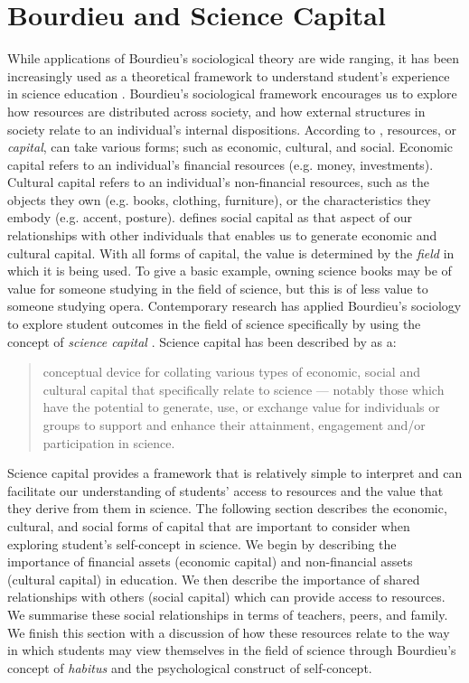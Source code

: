 \section{Bourdieu and Science Capital}
\label{sciencecapital}
While applications of Bourdieu's sociological theory are wide ranging, it has been increasingly used as a theoretical framework to understand student's experience in science education \citep{Archer2015a}. Bourdieu's sociological framework encourages us to explore how resources are distributed across society, and how external structures in society relate to an individual's internal dispositions.  According to \citet{Bourdieu_1986}, resources, or \textit{capital}, can take various forms; such as economic, cultural, and social. Economic capital refers to an individual's financial resources (e.g. money, investments). Cultural capital refers to an individual's non-financial resources, such as the objects they own (e.g. books, clothing, furniture), or the characteristics they embody (e.g. accent, posture). \citet{Bourdieu_1986} defines social capital as that aspect of our relationships with other individuals that enables us to generate economic and cultural capital. With all forms of capital, the value is determined by the \textit{field} in which it is being used. To give a basic example, owning science books may be of value for someone studying in the field of science, but this is of less value to someone studying opera. Contemporary research has applied Bourdieu's sociology to explore student outcomes in the field of science specifically by using the concept of \textit{science capital} \citep{Archer2015a}. Science capital has been described by \cite{Archer2014} as a:
\begin{quote}
conceptual device for collating various types of economic, social and cultural capital that specifically relate to science --- notably those which have the potential to generate, use, or exchange value for individuals or groups to support and enhance their attainment, engagement and/or participation in science.
\end{quote}
Science capital provides a framework that is relatively simple to interpret and can facilitate our understanding of students' access to resources and the value that they derive from them in science. The following section describes the economic, cultural, and social forms of capital that are important to consider when exploring student's self-concept in science.  We begin by describing the importance of financial assets (economic capital) and non-financial assets (cultural capital) in education. We then describe the importance of shared relationships with others (social capital) which can provide access to resources. We summarise these social relationships in terms of teachers, peers, and family. We finish this section with a discussion of how these resources relate to the way in which students may view themselves in the field of science through Bourdieu's concept of \textit{habitus} and the psychological construct of self-concept. 

